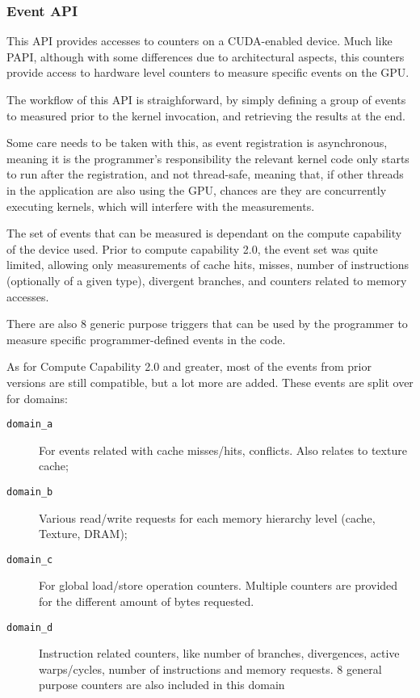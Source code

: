 \subsubsection{Event API}
\label{sec:cuda:prof:event}

This API provides accesses to counters on a CUDA-enabled device. Much like PAPI, although with some differences due to architectural aspects, this counters provide access to hardware level counters to measure specific events on the GPU.

The workflow of this API is straighforward, by simply defining a group of events to measured prior to the kernel invocation, and retrieving the results at the end.

Some care needs to be taken with this, as event registration is asynchronous, meaning it is the programmer's responsibility the relevant kernel code only starts to run after the registration, and not thread-safe, meaning that, if other threads in the application are also using the GPU, chances are they are concurrently executing kernels, which will interfere with the measurements.

The set of events that can be measured is dependant on the compute capability of the device used. Prior to compute capability 2.0, the event set was quite limited, allowing only measurements of cache hits, misses, number of instructions (optionally of a given type), divergent branches, and counters related to memory accesses.

There are also 8 generic purpose triggers that can be used by the programmer to measure specific programmer-defined events in the code.

As for Compute Capability 2.0 and greater, most of the events from prior versions are still compatible, but a lot more are added. These events are split over for domains:

\begin{description}
	\item[\texttt{domain\_a}] For events related with cache misses/hits, conflicts. Also relates to texture cache;

	\item[\texttt{domain\_b}] Various read/write requests for each memory hierarchy level (cache, Texture, DRAM);

	\item[\texttt{domain\_c}] For global load/store operation counters. Multiple counters are provided for the different amount of bytes requested.

	\item[\texttt{domain\_d}] Instruction related counters, like number of branches, divergences, active warps/cycles, number of instructions and memory requests. 8 general purpose counters are also included in this domain

\end{description}


